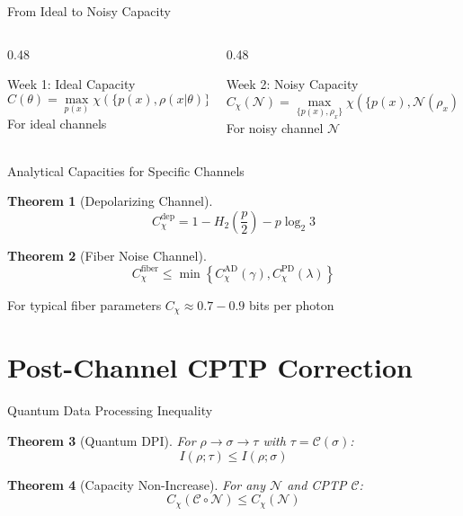 \documentclass{beamer}
\theoremstyle{definition}
\theoremstyle{plain}
\newtheorem{thm}{Theorem}[section]
\begin{document}
\begin{frame}{From Ideal to Noisy Capacity}
    \begin{columns}[T]
        \begin{column}{0.48\textwidth}
            \begin{block}{Week 1: Ideal Capacity}
                \centering
                \[
                C(\theta) = \max_{p(x)} \chi(\{p(x), \rho(x|\theta)\})
                \]
                For ideal channels
            \end{block}
        \end{column}
        
        \begin{column}{0.48\textwidth}
            \begin{block}{Week 2: Noisy Capacity}
                \centering
                \[
                C_\chi(\mathcal{N}) = \max_{\{p(x), \rho_x\}} \chi(\{p(x), \mathcal{N}(\rho_x)\})
                \]
                For noisy channel $\mathcal{N}$
            \end{block}
        \end{column}
    \end{columns}
\end{frame}

\begin{frame}{Analytical Capacities for Specific Channels}
    \begin{thm}[Depolarizing Channel]
        \[
        C_\chi^{\text{dep}} = 1 - H_2\left( \frac{p}{2} \right) - p \log_2 3
        \]
    \end{thm}
    
    \begin{thm}[Fiber Noise Channel]
        \[
        C_\chi^{\text{fiber}} \leq \min \left\{ C_\chi^{\text{AD}}(\gamma), C_\chi^{\text{PD}}(\lambda) \right\}
        \]
    \end{thm}
    
    \begin{block}{For typical fiber parameters}
        $C_\chi \approx 0.7-0.9$ bits per photon
    \end{block}
\end{frame}

\section{Post-Channel CPTP Correction}

\begin{frame}{Quantum Data Processing Inequality}
    \begin{thm}[Quantum DPI]
        For $\rho \to \sigma \to \tau$ with $\tau = \mathcal{C}(\sigma)$:
        \[
        I(\rho; \tau) \leq I(\rho; \sigma)
        \]
    \end{thm}
    
    \begin{thm}[Capacity Non-Increase]
        For any $\mathcal{N}$ and CPTP $\mathcal{C}$:
        \[
        C_\chi(\mathcal{C} \circ \mathcal{N}) \leq C_\chi(\mathcal{N})
        \]
    \end{thm}
\end{frame}
\end{document}
